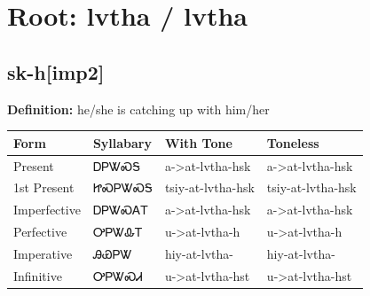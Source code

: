 \documentclass{article}%
\begin{document}
%
\normalsize%
\section*{Root: lvtha / lvtha}%
\subsection*{sk-h[imp2]}%
\textbf{Definition: }%
he/she is catching up with him/her%
\\[0.5em]%
\begin{tabular}{|l|l|l|l|}%
\hline%
\textbf{Form}&\textbf{Syllabary}&\textbf{With Tone}&\textbf{Toneless}\\%
\hline%
Present&ᎠᏢᏔᏍᎦ&a{-}>at{-}lvtha{-}hsk&a{-}>at{-}lvtha{-}hsk\\%
1st Present&ᏥᏍᏢᏔᏍᎦ&tsiy{-}at{-}lvtha{-}hsk&tsiy{-}at{-}lvtha{-}hsk\\%
Imperfective&ᎠᏢᏔᏍᎪᎢ&a{-}>at{-}lvtha{-}hsk&a{-}>at{-}lvtha{-}hsk\\%
Perfective&ᎤᏢᏔᎲᎢ&u{-}>at{-}lvtha{-}h&u{-}>at{-}lvtha{-}h\\%
Imperative&ᎯᏯᏢᏔ&hiy{-}at{-}lvtha{-}&hiy{-}at{-}lvtha{-}\\%
Infinitive&ᎤᏢᏔᏍᏗ&u{-}>at{-}lvtha{-}hst&u{-}>at{-}lvtha{-}hst\\%
\hline%
\end{tabular}%
\\[1em]%
\end{document}
